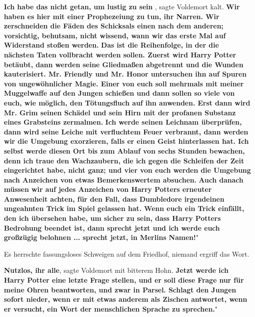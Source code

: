 \glqq{}\textbf{Ich habe das nicht getan, um lustig zu sein\grqq{}} , sagte
Voldemort kalt. \glqq{}\textbf{Wir haben es hier mit einer Prophezeiung zu tun,
ihr Narren. Wir zerschneiden die Fäden des Schicksals einen nach dem anderen;
vorsichtig, behutsam, nicht wissend, wann wir das erste Mal auf Widerstand
stoßen werden.} \textbf{ Das ist die Reihenfolge, in der die nächsten Taten
vollbracht werden sollen. Zuerst wird Harry Potter betäubt, dann werden seine
Gliedmaßen abgetrennt und die Wunden kauterisiert. Mr. Friendly und Mr. Honor
untersuchen ihn auf Spuren von ungewöhnlicher Magie. Einer von euch soll
mehrmals mit meiner Muggelwaffe auf den Jungen schießen und dann sollen so viele
von euch, wie möglich, den Tötungsfluch auf ihn anwenden. Erst dann wird Mr.
Grim seinen Schädel und sein Hirn mit der profanen Substanz eines Grabsteins
zermalmen.} \textbf{ Ich werde seinen Leichnam überprüfen, dann wird seine
Leiche mit verfluchtem Feuer verbrannt, dann werden wir die Umgebung exorzieren,
falls er einen Geist hinterlassen hat. Ich selbst werde diesen Ort bis zum
Ablauf von sechs Stunden bewachen, denn ich traue den Wachzaubern, die ich gegen
die Schleifen der Zeit eingerichtet habe, nicht ganz; und vier von euch werden
die Umgebung nach Anzeichen von etwas Bemerkenswertem absuchen.} \textbf{ Auch
danach müssen wir auf jedes Anzeichen von Harry Potters erneuter Anwesenheit
achten, für den Fall, dass Dumbledore irgendeinen ungeahnten Trick im Spiel
gelassen hat. Wenn euch ein Trick einfällt, den ich übersehen habe, um sicher zu
sein, dass Harry Potters Bedrohung beendet ist, dann sprecht jetzt und ich werde
euch großzügig belohnen ... sprecht jetzt, in Merlins Namen!}"

Es herrschte fassungsloses Schweigen auf dem Friedhof, niemand ergriff das Wort.

\glqq{}\textbf{Nutzlos, ihr alle}\grqq{}, sagte Voldemort mit bitterem Hohn.
\glqq{}\textbf{Jetzt werde ich Harry Potter eine letzte Frage stellen, und er
soll diese Frage nur für meine Ohren beantworten, und zwar in Parsel. Schlagt
den Jungen sofort nieder, wenn er mit etwas anderem als Zischen antwortet, wenn
er versucht, ein Wort der menschlichen Sprache zu sprechen.}"

